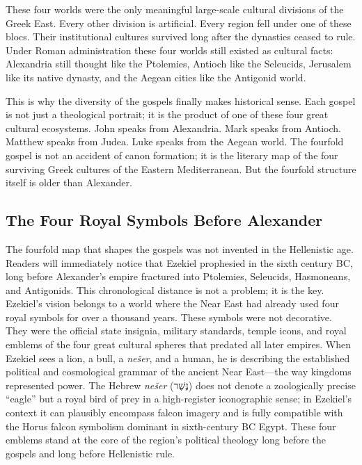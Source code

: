 These four worlds were the only meaningful large-scale cultural divisions of the Greek East.
Every other division is artificial.
Every region fell under one of these blocs.
Their institutional cultures survived long after the dynasties ceased to rule.
Under Roman administration these four worlds still existed as cultural facts: Alexandria still thought like the Ptolemies, Antioch like the Seleucids, Jerusalem like its native dynasty, and the Aegean cities like the Antigonid world.

This is why the diversity of the gospels finally makes historical sense.
Each gospel is not just a theological portrait; it is the product of one of these four great cultural ecosystems.
John speaks from Alexandria.
Mark speaks from Antioch.
Matthew speaks from Judea.
Luke speaks from the Aegean world.
The fourfold gospel is not an accident of canon formation; it is the literary map of the four surviving Greek cultures of the Eastern Mediterranean.
But the fourfold structure itself is older than Alexander.

\subsection{The Four Royal Symbols Before Alexander}

The fourfold map that shapes the gospels was not invented in the Hellenistic age.
Readers will immediately notice that Ezekiel prophesied in the sixth century BC, long before Alexander's empire fractured into Ptolemies, Seleucids, Hasmoneans, and Antigonids.
This chronological distance is not a problem; it is the key.
Ezekiel's vision belongs to a world where the Near East had already used four royal symbols for over a thousand years.
These symbols were not decorative.
They were the official state insignia, military standards, temple icons, and royal emblems of the four great cultural spheres that predated all later empires.
When Ezekiel sees a lion, a bull, a \emph{nešer}, and a human, he is describing the established political and cosmological grammar of the ancient Near East---the way kingdoms represented power.
The Hebrew \emph{nešer} (נֶשֶׁר) does not denote a zoologically precise ``eagle'' but a royal bird of prey in a high-register iconographic sense; in Ezekiel's context it can plausibly encompass falcon imagery and is fully compatible with the Horus falcon symbolism dominant in sixth-century BC Egypt.
These four emblems stand at the core of the region's political theology long before the gospels and long before Hellenistic rule.

